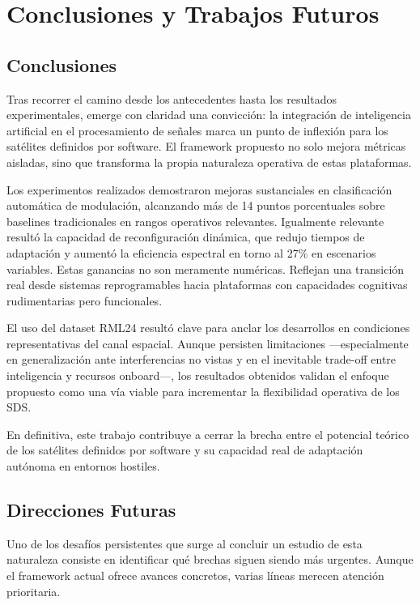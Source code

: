 \section{Conclusiones y Trabajos Futuros}

\subsection{Conclusiones}

Tras recorrer el camino desde los antecedentes hasta los resultados experimentales, emerge con claridad una convicción: la integración de inteligencia artificial en el procesamiento de señales marca un punto de inflexión para los satélites definidos por software. El framework propuesto no solo mejora métricas aisladas, sino que transforma la propia naturaleza operativa de estas plataformas.

Los experimentos realizados demostraron mejoras sustanciales en clasificación automática de modulación, alcanzando más de 14 puntos porcentuales sobre baselines tradicionales en rangos operativos relevantes. Igualmente relevante resultó la capacidad de reconfiguración dinámica, que redujo tiempos de adaptación y aumentó la eficiencia espectral en torno al 27\% en escenarios variables. Estas ganancias no son meramente numéricas. Reflejan una transición real desde sistemas reprogramables hacia plataformas con capacidades cognitivas rudimentarias pero funcionales.

El uso del dataset RML24 resultó clave para anclar los desarrollos en condiciones representativas del canal espacial. Aunque persisten limitaciones —especialmente en generalización ante interferencias no vistas y en el inevitable trade-off entre inteligencia y recursos onboard—, los resultados obtenidos validan el enfoque propuesto como una vía viable para incrementar la flexibilidad operativa de los SDS.

En definitiva, este trabajo contribuye a cerrar la brecha entre el potencial teórico de los satélites definidos por software y su capacidad real de adaptación autónoma en entornos hostiles.

\subsection{Direcciones Futuras}

Uno de los desafíos persistentes que surge al concluir un estudio de esta naturaleza consiste en identificar qué brechas siguen siendo más urgentes. Aunque el framework actual ofrece avances concretos, varias líneas merecen atención prioritaria.

